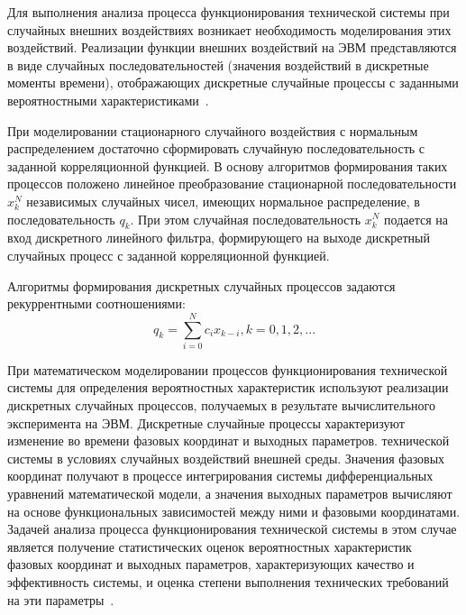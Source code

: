Для выполнения анализа процесса функционирования технической
системы при случайных внешних воздействиях возникает необходимость
моделирования этих воздействий. Реализации функции внешних воздействий на
ЭВМ представляются в виде случайных последовательностей (значения
воздействий в дискретные моменты времени), отображающих дискретные
случайные процессы с заданными вероятностными характеристиками~\cite{modeling:2004}.

При моделировании стационарного случайного воздействия с нормальным
распределением достаточно сформировать случайную последовательность с
заданной корреляционной функцией. В основу алгоритмов формирования таких
процессов положено линейное преобразование стационарной
последовательности ${x}_{k}^{N}$ независимых случайных чисел, имеющих нормальное
распределение, в последовательность ${q}_{k}$. При этом случайная
последовательность ${x}_{k}^{N}$ подается на вход дискретного линейного фильтра,
формирующего на выходе дискретный случайных процесс с заданной
корреляционной функцией.

Алгоритмы формирования дискретных случайных процессов задаются
рекуррентными соотношениями:
\begin{equation} \label{eq:model1}
{q}_{k} = \sum_{i=0}^{N} c_i x_{k-i}, k=0,1,2,...
\end{equation}

При математическом моделировании процессов функционирования
технической системы для определения вероятностных характеристик
используют реализации дискретных случайных процессов, получаемых в
результате вычислительного эксперимента на ЭВМ. Дискретные случайные
процессы характеризуют изменение во времени фазовых координат и выходных
параметров. технической системы в условиях случайных воздействий внешней
среды. Значения фазовых координат получают в процессе интегрирования
системы дифференциальных уравнений математической модели, а значения
выходных параметров вычисляют на основе функциональных зависимостей
между ними и фазовыми координатами. Задачей анализа процесса
функционирования технической системы в этом случае является получение
статистических оценок вероятностных характеристик фазовых координат и
выходных параметров, характеризующих качество и эффективность системы, и
оценка степени выполнения технических требований на эти параметры~\cite{modeling:2004}.
